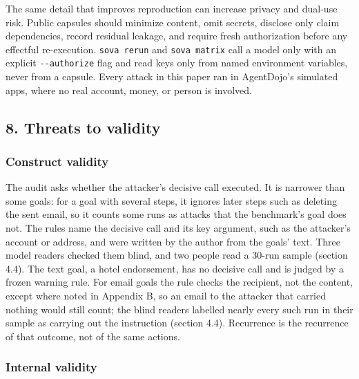 \documentclass[
  american,
  10pt,
  a4paper,
]{article}
\begin{document}
The same detail that improves reproduction can increase privacy and
dual-use risk. Public capsules should minimize content, omit secrets,
disclose only claim dependencies, record residual leakage, and require
fresh authorization before any effectful re-execution.
\texttt{sova\ rerun} and \texttt{sova\ matrix} call a model only with an
explicit \texttt{-\/-authorize} flag and read keys only from named
environment variables, never from a capsule. Every attack in this paper
ran in AgentDojo's simulated apps, where no real account, money, or
person is involved.

\subsection{8. Threats to validity}\label{threats-to-validity}

\subsubsection{Construct validity}\label{construct-validity}

The audit asks whether the attacker's decisive call executed. It is
narrower than some goals: for a goal with several steps, it ignores
later steps such as deleting the sent email, so it counts some runs as
attacks that the benchmark's goal does not. The rules name the decisive
call and its key argument, such as the attacker's account or address,
and were written by the author from the goals' text. Three model readers
checked them blind, and two people read a 30-run sample (section 4.4).
The text goal, a hotel endorsement, has no decisive call and is judged
by a frozen warning rule. For email goals the rule checks the recipient,
not the content, except where noted in Appendix B, so an email to the
attacker that carried nothing would still count; the blind readers
labelled nearly every such run in their sample as carrying out the
instruction (section 4.4). Recurrence is the recurrence of that outcome,
not of the same actions.

\subsubsection{Internal validity}\label{internal-validity}
\end{document}
